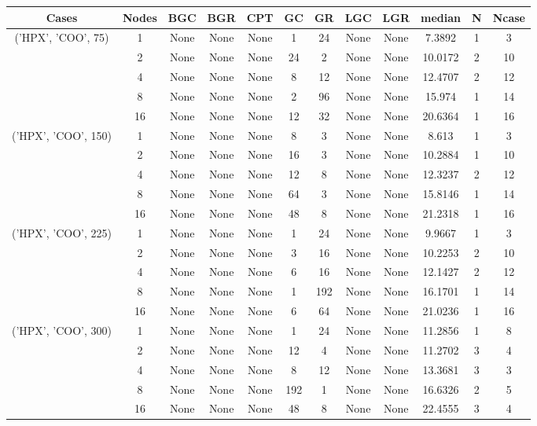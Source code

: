 \begin{tabular}{cccccccccccc}
\hline
Cases & Nodes& BGC& BGR& CPT& GC& GR& LGC& LGR& median & N & Ncase \\
\hline
\multirow{5}{*}{('HPX', 'COO', 75)}& 1& None& None& None& 1& 24& None& None& 7.3892& 1& 3\\
& 2& None& None& None& 24& 2& None& None& 10.0172& 2& 10\\
& 4& None& None& None& 8& 12& None& None& 12.4707& 2& 12\\
& 8& None& None& None& 2& 96& None& None& 15.974& 1& 14\\
& 16& None& None& None& 12& 32& None& None& 20.6364& 1& 16\\
\hline
\multirow{5}{*}{('HPX', 'COO', 150)}& 1& None& None& None& 8& 3& None& None& 8.613& 1& 3\\
& 2& None& None& None& 16& 3& None& None& 10.2884& 1& 10\\
& 4& None& None& None& 12& 8& None& None& 12.3237& 2& 12\\
& 8& None& None& None& 64& 3& None& None& 15.8146& 1& 14\\
& 16& None& None& None& 48& 8& None& None& 21.2318& 1& 16\\
\hline
\multirow{5}{*}{('HPX', 'COO', 225)}& 1& None& None& None& 1& 24& None& None& 9.9667& 1& 3\\
& 2& None& None& None& 3& 16& None& None& 10.2253& 2& 10\\
& 4& None& None& None& 6& 16& None& None& 12.1427& 2& 12\\
& 8& None& None& None& 1& 192& None& None& 16.1701& 1& 14\\
& 16& None& None& None& 6& 64& None& None& 21.0236& 1& 16\\
\hline
\multirow{5}{*}{('HPX', 'COO', 300)}& 1& None& None& None& 1& 24& None& None& 11.2856& 1& 8\\
& 2& None& None& None& 12& 4& None& None& 11.2702& 3& 4\\
& 4& None& None& None& 8& 12& None& None& 13.3681& 3& 3\\
& 8& None& None& None& 192& 1& None& None& 16.6326& 2& 5\\
& 16& None& None& None& 48& 8& None& None& 22.4555& 3& 4\\
\hline
\end{tabular}
